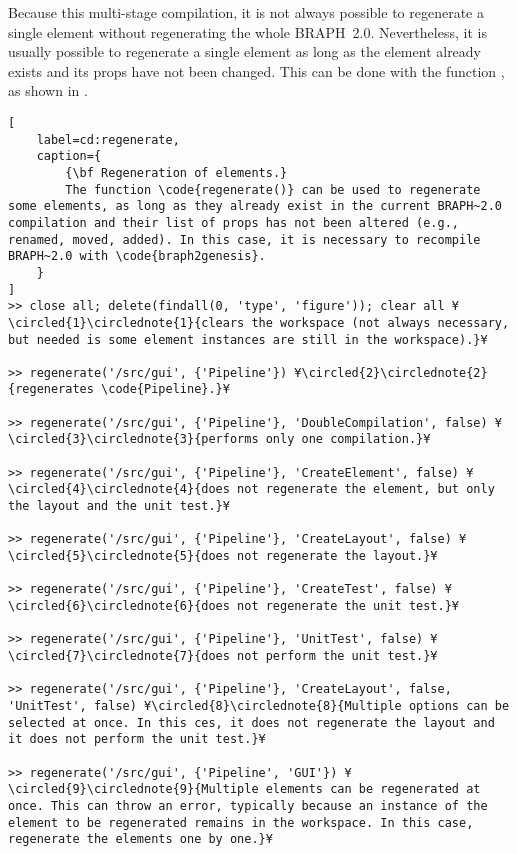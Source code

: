 \documentclass{tufte-handout}
\begin{document}
Because this multi-stage compilation, it is not always possible to regenerate a single element without regenerating the whole BRAPH~2.0. 
Nevertheless, it is usually possible to regenerate a single element as long as the element already exists and its props have not been changed.
This can be done with the function , as shown in .
%
\begin{lstlisting}[
	label=cd:regenerate,
	caption={
		{\bf Regeneration of elements.}
		The function \code{regenerate()} can be used to regenerate some elements, as long as they already exist in the current BRAPH~2.0 compilation and their list of props has not been altered (e.g., renamed, moved, added). In this case, it is necessary to recompile BRAPH~2.0 with \code{braph2genesis}.
	}
]
>> close all; delete(findall(0, 'type', 'figure')); clear all ¥\circled{1}\circlednote{1}{clears the workspace (not always necessary, but needed is some element instances are still in the workspace).}¥

>> regenerate('/src/gui', {'Pipeline'}) ¥\circled{2}\circlednote{2}{regenerates \code{Pipeline}.}¥

>> regenerate('/src/gui', {'Pipeline'}, 'DoubleCompilation', false) ¥\circled{3}\circlednote{3}{performs only one compilation.}¥

>> regenerate('/src/gui', {'Pipeline'}, 'CreateElement', false) ¥\circled{4}\circlednote{4}{does not regenerate the element, but only the layout and the unit test.}¥

>> regenerate('/src/gui', {'Pipeline'}, 'CreateLayout', false) ¥\circled{5}\circlednote{5}{does not regenerate the layout.}¥

>> regenerate('/src/gui', {'Pipeline'}, 'CreateTest', false) ¥\circled{6}\circlednote{6}{does not regenerate the unit test.}¥

>> regenerate('/src/gui', {'Pipeline'}, 'UnitTest', false) ¥\circled{7}\circlednote{7}{does not perform the unit test.}¥

>> regenerate('/src/gui', {'Pipeline'}, 'CreateLayout', false, 'UnitTest', false) ¥\circled{8}\circlednote{8}{Multiple options can be selected at once. In this ces, it does not regenerate the layout and it does not perform the unit test.}¥

>> regenerate('/src/gui', {'Pipeline', 'GUI'}) ¥\circled{9}\circlednote{9}{Multiple elements can be regenerated at once. This can throw an error, typically because an instance of the element to be regenerated remains in the workspace. In this case, regenerate the elements one by one.}¥
\end{lstlisting}
\end{document}
